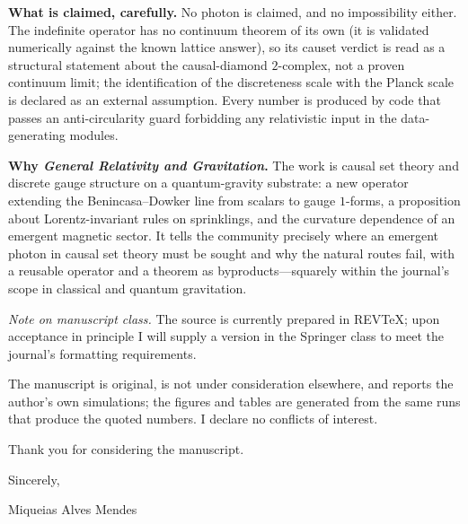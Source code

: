 \documentclass[11pt]{article}
\begin{document}
\textbf{What is claimed, carefully.} No photon is claimed, and no impossibility
either. The indefinite operator has no continuum theorem of its own (it is
validated numerically against the known lattice answer), so its causet verdict is
read as a structural statement about the causal-diamond $2$-complex, not a proven
continuum limit; the identification of the discreteness scale with the Planck
scale is declared as an external assumption. Every number is produced by code
that passes an anti-circularity guard forbidding any relativistic input in the
data-generating modules.

\textbf{Why \emph{General Relativity and Gravitation}.} The work is causal set
theory and discrete gauge structure on a quantum-gravity substrate: a new
operator extending the Benincasa--Dowker line from scalars to gauge $1$-forms, a
proposition about Lorentz-invariant rules on sprinklings, and the curvature
dependence of an emergent magnetic sector. It tells the community precisely where
an emergent photon in causal set theory must be sought and why the natural routes
fail, with a reusable operator and a theorem as byproducts---squarely within the
journal's scope in classical and quantum gravitation.

\emph{Note on manuscript class.} The source is currently prepared in REVTeX; upon
acceptance in principle I will supply a version in the Springer class to meet the
journal's formatting requirements.

The manuscript is original, is not under consideration elsewhere, and reports the
author's own simulations; the figures and tables are generated from the same runs
that produce the quoted numbers. I declare no conflicts of interest.

Thank you for considering the manuscript.

\vspace{10pt}
Sincerely,

Miqueias Alves Mendes
\end{document}
